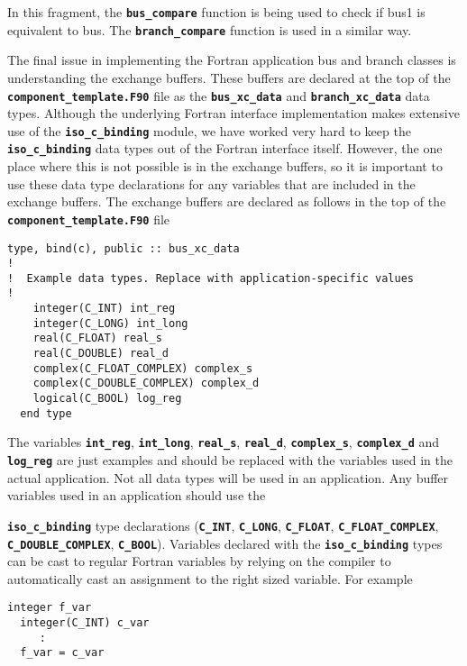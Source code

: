 In this fragment, the \texttt{\textbf{bus\_compare}} function is being used to check if bus1 is equivalent to bus. The \texttt{\textbf{branch\_compare}} function is used in a similar way.

The final issue in implementing the Fortran application bus and branch classes is understanding the exchange buffers. These buffers are declared at the top of the \texttt{\textbf{component\_template.F90}} file as the \texttt{\textbf{bus\_xc\_data}} and \texttt{\textbf{branch\_xc\_data}} data types. Although the underlying Fortran interface implementation makes extensive use of the \texttt{\textbf{iso\_c\_binding}} module, we have worked very hard to keep the \texttt{\textbf{iso\_c\_binding}} data types out of the Fortran interface itself. However, the one place where this is not possible is in the exchange buffers, so it is important to use these data type declarations for any variables that are included in the exchange buffers. The exchange buffers are declared as follows in the top of the \texttt{\textbf{component\_template.F90}} file

{
\color{red}
\begin{Verbatim}[fontseries=b]
  type, bind(c), public :: bus_xc_data
!
!  Example data types. Replace with application-specific values
!
    integer(C_INT) int_reg
    integer(C_LONG) int_long
    real(C_FLOAT) real_s
    real(C_DOUBLE) real_d
    complex(C_FLOAT_COMPLEX) complex_s
    complex(C_DOUBLE_COMPLEX) complex_d
    logical(C_BOOL) log_reg
  end type
\end{Verbatim}
}

The variables \texttt{\textbf{int\_reg}}, \texttt{\textbf{int\_long}}, \texttt{\textbf{real\_s}}, \texttt{\textbf{real\_d}}, \texttt{\textbf{complex\_s}}, \texttt{\textbf{complex\_d}} and \texttt{\textbf{log\_reg}} are just examples and should be replaced with the variables used in the actual application. Not all data types will be used in an application. Any buffer variables used in an application should use the

 \texttt{\textbf{iso\_c\_binding}} type declarations (\texttt{\textbf{C\_INT}}, \texttt{\textbf{C\_LONG}}, \texttt{\textbf{C\_FLOAT}}, \texttt{\textbf{C\_FLOAT\_COMPLEX}}, \texttt{\textbf{C\_DOUBLE\_COMPLEX}}, \texttt{\textbf{C\_BOOL}}). Variables declared with the \texttt{\textbf{iso\_c\_binding}} types can be cast to regular Fortran variables by relying on the compiler to automatically cast an assignment to the right sized variable. For example

{
\color{red}
\begin{Verbatim}[fontseries=b]
  integer f_var
  integer(C_INT) c_var
     :
  f_var = c_var
\end{Verbatim}
}

